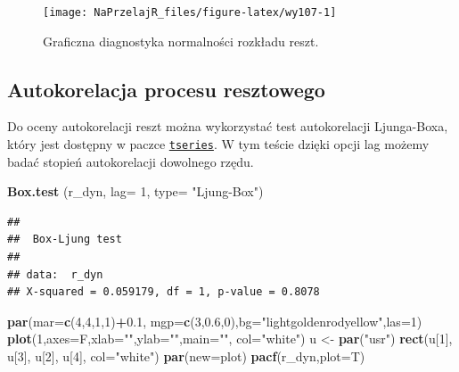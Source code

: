 \documentclass[polish,]{book}
\newenvironment{Shaded}{\begin{snugshade}}{\end{snugshade}}
\newcommand{\DataTypeTok}[1]{\textcolor[rgb]{0.13,0.29,0.53}{#1}}
\newcommand{\DecValTok}[1]{\textcolor[rgb]{0.00,0.00,0.81}{#1}}
\newcommand{\FloatTok}[1]{\textcolor[rgb]{0.00,0.00,0.81}{#1}}
\newcommand{\KeywordTok}[1]{\textcolor[rgb]{0.13,0.29,0.53}{\textbf{#1}}}
\newcommand{\NormalTok}[1]{#1}
\newcommand{\OperatorTok}[1]{\textcolor[rgb]{0.81,0.36,0.00}{\textbf{#1}}}
\newcommand{\StringTok}[1]{\textcolor[rgb]{0.31,0.60,0.02}{#1}}
\begin{document}
\begin{figure}[h]

{\centering \texttt{[image: NaPrzelajR\_files/figure-latex/wy107-1]} 

}

\caption{Graficzna diagnostyka normalności rozkładu reszt.}\label{fig:wy107}
\end{figure}

\hypertarget{part_10.4.2}{%
\subsection{Autokorelacja procesu resztowego}\label{part_10.4.2}}

Do oceny autokorelacji reszt można wykorzystać test autokorelacji Ljunga-Boxa,
który jest dostępny w paczce \href{https://rdrr.io/cran/tseries/}{\texttt{tseries}}. W tym teście dzięki opcji lag możemy badać
stopień autokorelacji dowolnego rzędu.

\begin{Shaded}
\begin{Highlighting}[]
\KeywordTok{Box.test}\NormalTok{ (r_dyn, }\DataTypeTok{lag=} \DecValTok{1}\NormalTok{, }\DataTypeTok{type=} \StringTok{"Ljung-Box"}\NormalTok{)}
\end{Highlighting}
\end{Shaded}

\begin{verbatim}
## 
##  Box-Ljung test
## 
## data:  r_dyn
## X-squared = 0.059179, df = 1, p-value = 0.8078
\end{verbatim}

\begin{Shaded}
\begin{Highlighting}[]
\KeywordTok{par}\NormalTok{(}\DataTypeTok{mar=}\KeywordTok{c}\NormalTok{(}\DecValTok{4}\NormalTok{,}\DecValTok{4}\NormalTok{,}\DecValTok{1}\NormalTok{,}\DecValTok{1}\NormalTok{)}\OperatorTok{+}\FloatTok{0.1}\NormalTok{, }\DataTypeTok{mgp=}\KeywordTok{c}\NormalTok{(}\DecValTok{3}\NormalTok{,}\FloatTok{0.6}\NormalTok{,}\DecValTok{0}\NormalTok{),}\DataTypeTok{bg=}\StringTok{"lightgoldenrodyellow"}\NormalTok{,}\DataTypeTok{las=}\DecValTok{1}\NormalTok{)}
\KeywordTok{plot}\NormalTok{(}\DecValTok{1}\NormalTok{,}\DataTypeTok{axes=}\NormalTok{F,}\DataTypeTok{xlab=}\StringTok{""}\NormalTok{,}\DataTypeTok{ylab=}\StringTok{""}\NormalTok{,}\DataTypeTok{main=}\StringTok{""}\NormalTok{, }\DataTypeTok{col=}\StringTok{"white"}\NormalTok{)}
\NormalTok{u <-}\StringTok{ }\KeywordTok{par}\NormalTok{(}\StringTok{"usr"}\NormalTok{)}
\KeywordTok{rect}\NormalTok{(u[}\DecValTok{1}\NormalTok{], u[}\DecValTok{3}\NormalTok{], u[}\DecValTok{2}\NormalTok{], u[}\DecValTok{4}\NormalTok{], }\DataTypeTok{col=}\StringTok{"white"}\NormalTok{)}
\KeywordTok{par}\NormalTok{(}\DataTypeTok{new=}\NormalTok{plot)}
\KeywordTok{pacf}\NormalTok{(r_dyn,}\DataTypeTok{plot=}\NormalTok{T)}
\end{Highlighting}
\end{Shaded}
\end{document}
